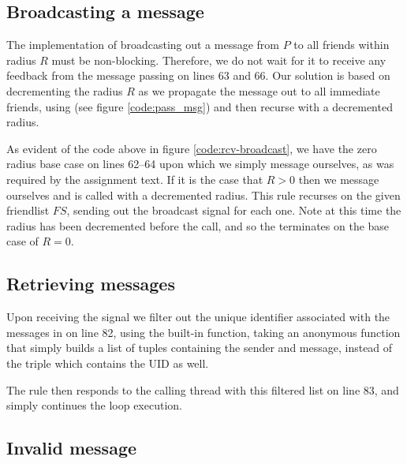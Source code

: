 \subsection{Broadcasting a message}
The implementation of broadcasting out a message from $P$ to all friends
within radius $R$ must be non-blocking. Therefore, we do not wait for it to
receive any feedback from the message passing on lines 63 and 66. Our solution
is based on decrementing the radius $R$ as we propagate the message out to all
immediate friends, using  (see figure \ref{code:pass_msg}) and
then recurse with a decremented radius.


As evident of the code above in figure \ref{code:rcv-broadcast}, we have the
zero radius base case on lines 62--64 upon which we simply message ourselves,
as was required by the assignment text. If it is the case that $R > 0$ then we
message ourselves and  is called with a decremented radius.
This rule recurses on the given friendlist $FS$, sending out the broadcast
signal for each one. Note at this time the radius has been decremented before
the call, and so the terminates on the base case of $R=0$.


\subsection{Retrieving messages}
Upon receiving the  signal we filter out the unique identifier
associated with the messages in  on line 82, using the built-in
 function, taking an anonymous function that simply builds a
list of tuples containing the sender and message, instead of the triple which
contains the UID as well.


The rule then responds to the calling thread with this filtered list on line
83, and simply continues the loop execution.

\subsection{Invalid message}
